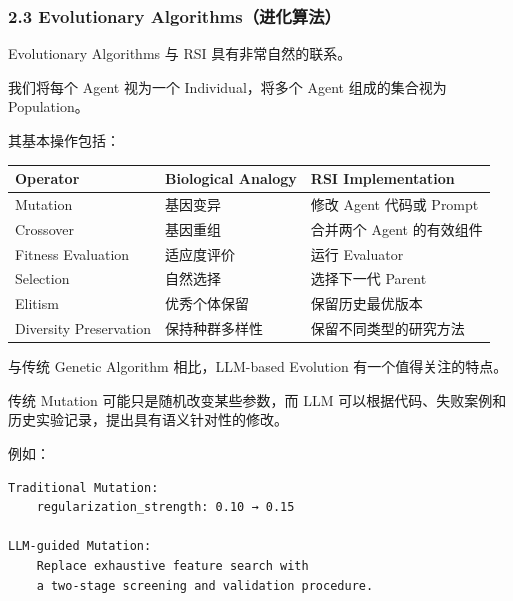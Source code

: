 \hypertarget{part-3-40-0001-evolutionary-algorithmsux8fdbux5316ux7b97ux6cd5}{%
\subsubsection{2.3 Evolutionary Algorithms（进化算法）}\label{part-3-40-0001-evolutionary-algorithmsux8fdbux5316ux7b97ux6cd5}}

Evolutionary Algorithms 与 RSI 具有非常自然的联系。

我们将每个 Agent 视为一个 Individual，将多个 Agent 组成的集合视为 Population。

其基本操作包括：

\begin{readertable}
\begin{longtable}[]{@{}
  >{\raggedright\arraybackslash}p{}
  >{\raggedright\arraybackslash}p{}
  >{\raggedright\arraybackslash}p{}@{}}
\toprule
Operator & Biological Analogy & RSI Implementation \\
\midrule
\endhead
Mutation & 基因变异 & 修改 Agent 代码或 Prompt \\
Crossover & 基因重组 & 合并两个 Agent 的有效组件 \\
Fitness Evaluation & 适应度评价 & 运行 Evaluator \\
Selection & 自然选择 & 选择下一代 Parent \\
Elitism & 优秀个体保留 & 保留历史最优版本 \\
Diversity Preservation & 保持种群多样性 & 保留不同类型的研究方法 \\
\bottomrule
\end{longtable}
\end{readertable}


与传统 Genetic Algorithm 相比，LLM-based Evolution 有一个值得关注的特点。

传统 Mutation 可能只是随机改变某些参数，而 LLM 可以根据代码、失败案例和历史实验记录，提出具有语义针对性的修改。

例如：

\begin{verbatim}
Traditional Mutation:
    regularization_strength: 0.10 → 0.15

LLM-guided Mutation:
    Replace exhaustive feature search with
    a two-stage screening and validation procedure.
\end{verbatim}


